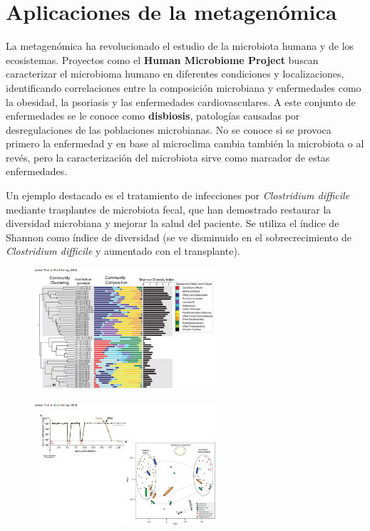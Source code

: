 \section{Aplicaciones de la metagenómica}
La metagenómica ha revolucionado el estudio de la microbiota humana y de los ecosistemas. Proyectos como el \textbf{Human Microbiome Project} buscan caracterizar el microbioma humano en diferentes condiciones y localizaciones, identificando correlaciones entre la composición microbiana y enfermedades como la obesidad, la psoriasis y las enfermedades cardiovasculares. A este conjunto de enfermedades se le conoce como \textbf{disbiosis}, patologías causadas por desregulaciones de las poblaciones microbianas. No se conoce si se provoca primero la enfermedad y en base al microclima cambia también la microbiota o al revés, pero la caracterización del microbiota sirve como marcador de estas enfermedades.

Un ejemplo destacado es el tratamiento de infecciones por \textit{Clostridium difficile} mediante trasplantes de microbiota fecal, que han demostrado restaurar la diversidad microbiana y mejorar la salud del paciente. Se utiliza el índice de Shannon como índice de diversidad (se ve disminuido en el sobrecrecimiento de \textit{Clostridium difficile} y aumentado con el transplante).

\begin{figure}[h]
\centering
\includegraphics[width = 0.6\textwidth]{figs/c-difficile-1.png}
\end{figure}

\begin{figure}[h]
\centering
\includegraphics[width = 0.6\textwidth]{figs/c-difficile-2.png}
\end{figure}

